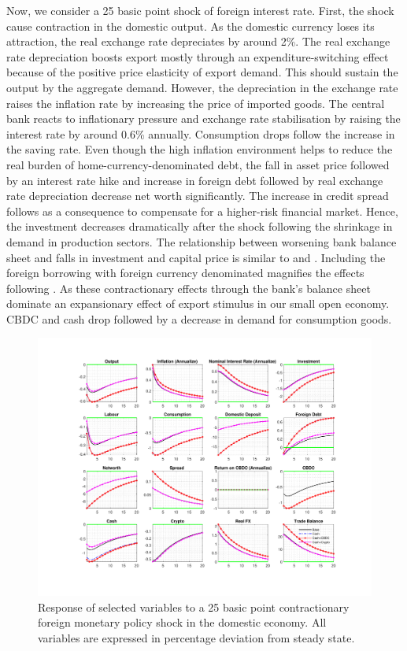 \documentclass[12pt, a4paper]{article}
\begin{document}
Now, we consider a 25 basic point shock of foreign interest rate. First, the shock cause contraction in the domestic output. As the domestic currency loses its attraction, the real exchange rate depreciates by around 2\%. The real exchange rate depreciation boosts export mostly through an expenditure-switching effect because of the positive price elasticity of export demand. This should sustain the output by the aggregate demand. However, the depreciation in the exchange rate raises the inflation rate by increasing the price of imported goods. The central bank reacts to inflationary pressure and exchange rate stabilisation by raising the interest rate by around 0.6\% annually. Consumption drops follow the increase in the saving rate. Even though the high inflation environment helps to reduce the real burden of home-currency-denominated debt, the fall in asset price followed by an interest rate hike and increase in foreign debt followed by real exchange rate depreciation decrease net worth significantly. The increase in credit spread follows as a consequence to compensate for a higher-risk financial market. Hence, the investment decreases dramatically after the shock following the shrinkage in demand in production sectors. The relationship between worsening bank balance sheet and falls in investment and capital price is similar to \cite{kiyotaki1997credit} and \cite{gertler2015monetary}. Including the foreign borrowing with foreign currency denominated magnifies the effects following \cite{aoki2016monetary}. As these contractionary effects through the bank's balance sheet dominate an expansionary effect of export stimulus in our small open economy. CBDC and cash drop followed by a decrease in demand for consumption goods.


\begin{figure}[H]
  \hspace{-0.7cm}
	\centering
	\centerline{\includegraphics[trim = 0mm 23mm 0mm 18mm, clip, scale=0.97]{foreign_cashvs.pdf}}
	\caption{Response of selected variables to a 25 basic point contractionary foreign monetary policy shock in the domestic economy. All variables are expressed in percentage deviation from steady state.}
	\label{foreign}
\end{figure}
\end{document}

